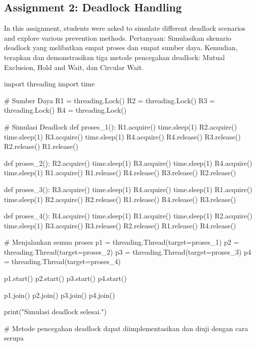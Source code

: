 \documentclass[12pt]{article}
\begin{document}
\subsection{Assignment 2: Deadlock Handling}
In this assignment, students were asked to simulate different deadlock scenarios and explore various prevention methods.
Pertanyaan:
Simulasikan skenario deadlock yang melibatkan empat proses dan empat sumber daya. Kemudian, terapkan dan demonstrasikan tiga metode pencegahan deadlock: Mutual Exclusion, Hold and Wait, dan Circular Wait.

\begin{python}
    import threading
    import time

    # Sumber Daya
    R1 = threading.Lock()
    R2 = threading.Lock()
    R3 = threading.Lock()
    R4 = threading.Lock()

    # Simulasi Deadlock
    def proses_1():
        R1.acquire()
        time.sleep(1)
        R2.acquire()
        time.sleep(1)
        R3.acquire()
        time.sleep(1)
        R4.acquire()
        R4.release()
        R3.release()
        R2.release()
        R1.release()

    def proses_2():
        R2.acquire()
        time.sleep(1)
        R3.acquire()
        time.sleep(1)
        R4.acquire()
        time.sleep(1)
        R1.acquire()
        R1.release()
        R4.release()
        R3.release()
        R2.release()

    def proses_3():
        R3.acquire()
        time.sleep(1)
        R4.acquire()
        time.sleep(1)
        R1.acquire()
        time.sleep(1)
        R2.acquire()
        R2.release()
        R1.release()
        R4.release()
        R3.release()

    def proses_4():
        R4.acquire()
        time.sleep(1)
        R1.acquire()
        time.sleep(1)
        R2.acquire()
        time.sleep(1)
        R3.acquire()
        R3.release()
        R2.release()
        R1.release()
        R4.release()

    # Menjalankan semua proses
    p1 = threading.Thread(target=proses_1)
    p2 = threading.Thread(target=proses_2)
    p3 = threading.Thread(target=proses_3)
    p4 = threading.Thread(target=proses_4)

    p1.start()
    p2.start()
    p3.start()
    p4.start()

    p1.join()
    p2.join()
    p3.join()
    p4.join()

    print("Simulasi deadlock selesai.")

    # Metode pencegahan deadlock dapat diimplementasikan dan diuji dengan cara serupa

\end{python}
\end{document}
